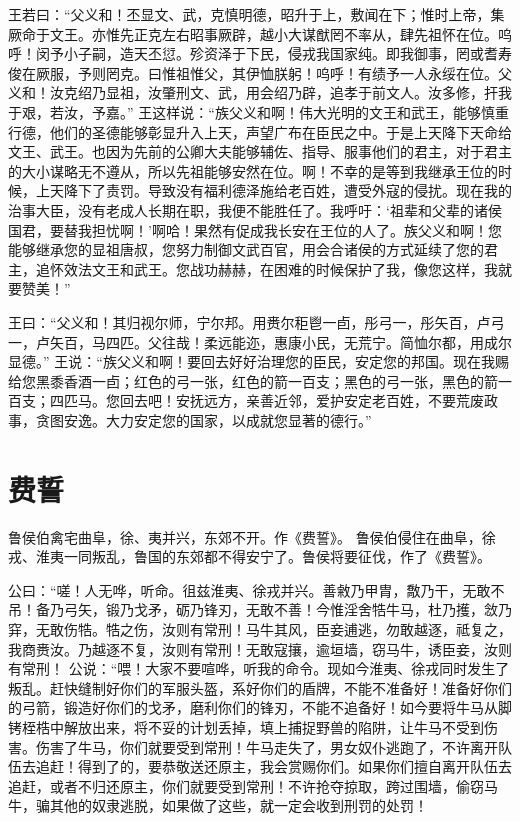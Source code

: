 \documentclass[12pt,UTF8]{ctexbook}
\begin{document}
王若曰：“父义和！丕显文、武，克慎明德，昭升于上，敷闻在下；惟时上帝，集厥命于文王。亦惟先正克左右昭事厥辟，越小大谋猷罔不率从，肆先祖怀在位。呜呼！闵予小子嗣，造天丕愆。殄资泽于下民，侵戎我国家纯。即我御事，罔或耆寿俊在厥服，予则罔克。曰惟祖惟父，其伊恤朕躬！呜呼！有绩予一人永绥在位。父义和！汝克绍乃显祖，汝肇刑文、武，用会绍乃辟，追孝于前文人。汝多修，扞我于艰，若汝，予嘉。”
王这样说：“族父义和啊！伟大光明的文王和武王，能够慎重行德，他们的圣德能够彰显升入上天，声望广布在臣民之中。于是上天降下天命给文王、武王。也因为先前的公卿大夫能够辅佐、指导、服事他们的君主，对于君主的大小谋略无不遵从，所以先祖能够安然在位。啊！不幸的是等到我继承王位的时候，上天降下了责罚。导致没有福利德泽施给老百姓，遭受外寇的侵扰。现在我的治事大臣，没有老成人长期在职，我便不能胜任了。我呼吁：‘祖辈和父辈的诸侯国君，要替我担忧啊！’啊哈！果然有促成我长安在王位的人了。族父义和啊！您能够继承您的显祖唐叔，您努力制御文武百官，用会合诸侯的方式延续了您的君主，追怀效法文王和武王。您战功赫赫，在困难的时候保护了我，像您这样，我就要赞美！”

王曰：“父义和！其归视尔师，宁尔邦。用赉尔秬鬯一卣，彤弓一，彤矢百，卢弓一，卢矢百，马四匹。父往哉！柔远能迩，惠康小民，无荒宁。简恤尔都，用成尔显德。”
王说：“族父义和啊！要回去好好治理您的臣民，安定您的邦国。现在我赐给您黑黍香酒一卣；红色的弓一张，红色的箭一百支；黑色的弓一张，黑色的箭一百支；四匹马。您回去吧！安抚远方，亲善近邻，爱护安定老百姓，不要荒废政事，贪图安逸。大力安定您的国家，以成就您显著的德行。”

\chapter{费誓}

鲁侯伯禽宅曲阜，徐、夷并兴，东郊不开。作《费誓》。
鲁侯伯侵住在曲阜，徐戎、淮夷一同叛乱，鲁国的东郊都不得安宁了。鲁侯将要征伐，作了《费誓》。

公曰：“嗟！人无哗，听命。徂兹淮夷、徐戎并兴。善敹乃甲胄，敿乃干，无敢不吊！备乃弓矢，锻乃戈矛，砺乃锋刃，无敢不善！今惟淫舍牿牛马，杜乃擭，敜乃穽，无敢伤牿。牿之伤，汝则有常刑！马牛其风，臣妾逋逃，勿敢越逐，祗复之，我商赉汝。乃越逐不复，汝则有常刑！无敢寇攘，逾垣墙，窃马牛，诱臣妾，汝则有常刑！
公说：“喂！大家不要喧哗，听我的命令。现如今淮夷、徐戎同时发生了叛乱。赶快缝制好你们的军服头盔，系好你们的盾牌，不能不准备好！准备好你们的弓箭，锻造好你们的戈矛，磨利你们的锋刃，不能不追备好！如今要将牛马从脚铐桎梏中解放出来，将不妥的计划丢掉，填上捕捉野兽的陷阱，让牛马不受到伤害。伤害了牛马，你们就要受到常刑！牛马走失了，男女奴仆逃跑了，不许离开队伍去追赶！得到了的，要恭敬送还原主，我会赏赐你们。如果你们擅自离开队伍去追赶，或者不归还原主，你们就要受到常刑！不许抢夺掠取，跨过围墙，偷窃马牛，骗其他的奴隶逃脱，如果做了这些，就一定会收到刑罚的处罚！
\end{document}
